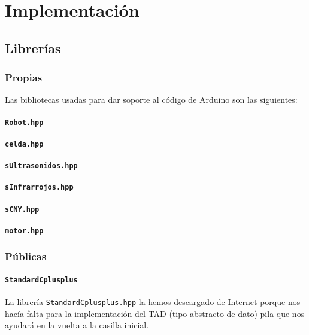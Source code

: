 \chapter{Implementación}
\section{Librerías}
\subsection{Propias}
Las \hypertarget{bibliotecas}{bibliotecas} usadas para dar soporte al código de Arduino son las siguientes:
\subsubsection{\texttt{Robot.hpp}}
\hypertarget{Robot}{}

\subsubsection{\texttt{celda.hpp}}
\hypertarget{Celda}{}

\subsubsection{\texttt{sUltrasonidos.hpp}}
\hypertarget{sUltrasonidos}{}

\subsubsection{\texttt{sInfrarrojos.hpp}}
\hypertarget{sInfrarrojos}{}

\subsubsection{\texttt{sCNY.hpp}}
\hypertarget{sCNY}{}

\subsubsection{\texttt{motor.hpp}}
\hypertarget{Motor}{}


\subsection{Públicas}
\subsubsection{\texttt{StandardCplusplus}}
La librería \hypertarget{StandardCplusplus}{\texttt{StandardCplusplus.hpp}} la hemos descargado de Internet porque nos hacía falta para la implementación del TAD (tipo abstracto de dato) pila que nos ayudará en la vuelta a la casilla inicial.

